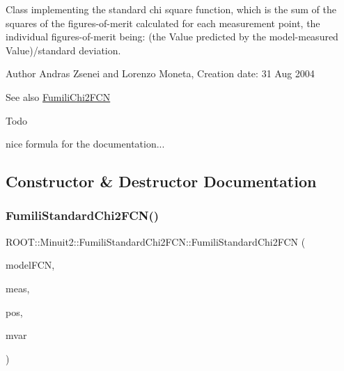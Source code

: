 Class implementing the standard chi square function, which is the sum of the squares of the figures-\/of-\/merit calculated for each measurement point, the individual figures-\/of-\/merit being\+: (the Value predicted by the model-\/measured Value)/standard deviation.

\begin{DoxyAuthor}{Author}
Andras Zsenei and Lorenzo Moneta, Creation date\+: 31 Aug 2004
\end{DoxyAuthor}
\begin{DoxySeeAlso}{See also}
\mbox{\hyperlink{classROOT_1_1Minuit2_1_1FumiliChi2FCN}{Fumili\+Chi2\+F\+CN}}
\end{DoxySeeAlso}
\begin{DoxyRefDesc}{Todo}
\item[\mbox{\hyperlink{todo__todo000021}{Todo}}]nice formula for the documentation...\end{DoxyRefDesc}


\subsection{Constructor \& Destructor Documentation}
\mbox{\label{classROOT_1_1Minuit2_1_1FumiliStandardChi2FCN_a1b86269a64b1368ac6d33de89f32674d}} 
\subsubsection{\texorpdfstring{FumiliStandardChi2FCN()}{FumiliStandardChi2FCN()}\hspace{0.1cm}{\footnotesize\ttfamily [1/4]}}
{\footnotesize\ttfamily R\+O\+O\+T\+::\+Minuit2\+::\+Fumili\+Standard\+Chi2\+F\+C\+N\+::\+Fumili\+Standard\+Chi2\+F\+CN (\begin{DoxyParamCaption}\item[{const \mbox{\hyperlink{classROOT_1_1Minuit2_1_1ParametricFunction}{Parametric\+Function}} \&}]{model\+F\+CN,  }\item[{const std\+::vector$<$ double $>$ \&}]{meas,  }\item[{const std\+::vector$<$ double $>$ \&}]{pos,  }\item[{const std\+::vector$<$ double $>$ \&}]{mvar }\end{DoxyParamCaption})\hspace{0.3cm}{\ttfamily [inline]}}

